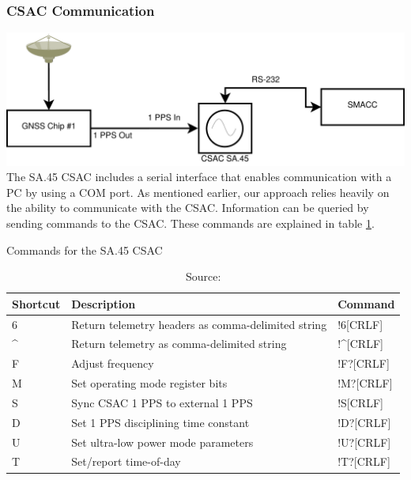 \documentclass[12pt,english,a4paper]{report}
\begin{document}
\subsubsection{CSAC Communication}
  \includegraphics[width=1\textwidth]{csac_serial.pdf}
The SA.45 CSAC includes a serial interface that enables communication with a PC by using a COM port. As mentioned earlier, our approach relies heavily on the ability to communicate with the CSAC.
Information can be queried by sending commands to the CSAC. These commands are explained in table \ref{CSAC_COMMANDS}. 
\begin{table}[]
\centering
\caption{Commands for the SA.45 CSAC}
\label{CSAC_COMMANDS}
\begin{tabular}{|l|l|l|}
\hline
Shortcut          & Description                                        & Command                       \\ \hline
6                 & Return telemetry headers as comma-delimited string & !6{[}CRLF{]}                  \\ \hline
\textasciicircum  & Return telemetry as comma-delimited string         & !\textasciicircum  {[}CRLF{]} \\ \hline
F                 & Adjust frequency                                   & !F?{[}CRLF{]}                 \\ \hline
M                 & Set operating mode register bits                   & !M?{[}CRLF{]}                 \\ \hline
S                 & Sync CSAC 1 PPS to external 1 PPS                  & !S{[}CRLF{]}                  \\ \hline
D                 & Set 1 PPS disciplining time constant               & !D?{[}CRLF{]}                 \\ \hline
U                 & Set ultra-low power mode parameters                & !U?{[}CRLF{]}                 \\ \hline
T                 & Set/report time-of-day                             & !T?{[}CRLF{]}                 \\ \hline
\end{tabular}
\caption*{Source: \cite{CSAC_USERGUIDE}}
\end{table}
\end{document}
